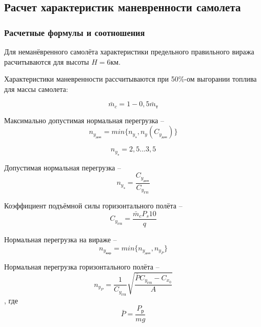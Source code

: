 \subsection{Расчет характеристик маневренности самолета}
\label{sec:Расчёт характеристик манёвренности самолёта}

\subsubsection{Расчетные формулы и соотношения}

Для неманёвренного самолёта характеристики предельного правильного виража расчитываются для высоты $H = 6$км.

Характеристики маневренности рассчитываются при 50\%-ом выгорании топлива для
массы самолета: 

\begin{equation}
    \label{eq:Относительная масса смолёта}
    \bar{m}_c = 1-0,5\bar{m}_\text{т}
\end{equation}

Максимально допустимая нормальная перегрузка -- 
\begin{equation}
    \label{eq:Максимально допустимая нормальная перегрузка}
    n_{y_\text{доп}} = min \{n_{y_\text{э}},n_{y}(C_{y_\text{доп}}) \}
\end{equation}

\begin{equation}
    \label{eq:Эксплуатационная перегрузка}
    n_{y_\text{э}} = 2,5...3,5
\end{equation}

Допустимая нормальная перегрузка -- 
\begin{equation}
    \label{eq:Допустимая нормальная перегрузка}
    n_{y_\text{э}} = \frac{C_{y_\text{доп}}}{C_{y_\text{ГП}}}
\end{equation}

Коэффициент подъёмной силы горизонтального полёта --
\begin{equation}
    \label{eq:Коэффициент подъёмной силы горизонтального полёта}
    C_{y_\text{ГП}} = \frac{\bar{m}_cP_s10}{q}
\end{equation}

Нормальная перегрузка на вираже --
\begin{equation}
    \label{eq:Нормальная перегрузка на вираже}
    n_{y_\text{вир}} = min \{ n_{y_\text{доп}}, n_{y_P} \}
\end{equation}

Нормальная перегрузка горизонтального полёта -- 
\begin{equation}
    \label{eq:Нормальная перегрузка горизонтального полёта}
    n_{y_P} = \frac{1}{C_{y_\text{ГП}}} \sqrt{\frac{\bar{P}C_{y_\text{ГП}}-C_{x_0}}{A}}
\end{equation},
где $$\bar{P} = \frac{P_\text{р}}{mg}$$

